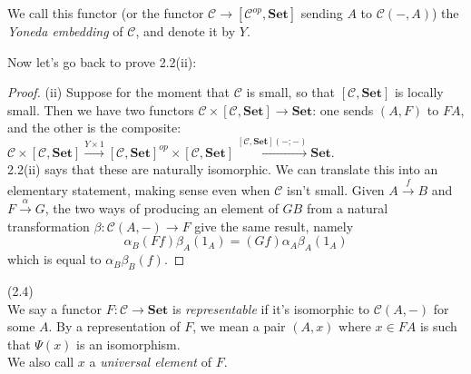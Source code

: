 \documentclass[a4paper]{article}
\begin{document}
We call this functor (or the functor $\mathcal{C} \to [\mathcal{C}^{op}, \mathbf{Set}]$ sending $A$ to $\mathcal{C}(-,A)$) the \emph{Yoneda embedding} of $\mathcal{C}$, and denote it by $Y$.

Now let's go back to prove 2.2(ii):
\begin{proof}
    (ii) Suppose for the moment that $\mathcal{C}$ is small, so that $[\mathcal{C},\mathbf{Set}]$ is locally small. Then we have two functors $\mathcal{C} \times [\mathcal{C},\mathbf{Set}] \to \mathbf{Set}$: one sends $(A,F)$ to $FA$, and the other is the composite: $\mathcal{C} \times [\mathcal{C},\mathbf{Set}] \xrightarrow{Y \times 1} [\mathcal{C},\mathbf{Set}]^{op} \times [\mathcal{C},\mathbf{Set}] \xrightarrow{[\mathcal{C},\mathbf{Set}](-;-)} \mathbf{Set}$.\\
    2.2(ii) says that these are naturally isomorphic. We can translate this into an elementary statement, making sense even when $\mathcal{C}$ isn't small. Given $A \xrightarrow{f} B$ and $F \xrightarrow{\alpha}G$, the two ways of producing an element of $GB$ from a natural transformation $\beta:\mathcal{C}(A,-) \to F$ give the same result, namely $$\alpha_B(Ff)\beta_A(1_A) = (Gf)\alpha_A\beta_A(1_A)$$ which is equal to $\alpha_B\beta_B(f)$.
\end{proof}

\begin{defi} (2.4)\\
    We say a functor $F:\mathcal{C} \to \mathbf{Set}$ is \emph{representable} if it's isomorphic to $\mathcal{C}(A,-)$ for some $A$. By a representation of $F$, we mean a pair $(A,x)$ where $x \in FA$ is such that $\Psi(x)$ is an isomorphism.\\
    We also call $x$ a \emph{universal element} of $F$.
\end{defi}
\end{document}
